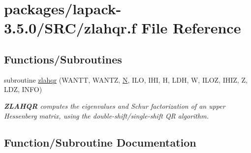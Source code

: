 \hypertarget{lapack-3_85_80_2SRC_2zlahqr_8f}{}\section{packages/lapack-\/3.5.0/\+S\+R\+C/zlahqr.f File Reference}
\label{lapack-3_85_80_2SRC_2zlahqr_8f}
\subsection*{Functions/\+Subroutines}
\begin{DoxyCompactItemize}
\item 
subroutine \hyperlink{lapack-3_85_80_2SRC_2zlahqr_8f_a32a8dc4443c2f0f528363b99d7a7b7e6}{zlahqr} (W\+A\+N\+T\+T, W\+A\+N\+T\+Z, \hyperlink{polmisc_8c_a0240ac851181b84ac374872dc5434ee4}{N}, I\+L\+O, I\+H\+I, H, L\+D\+H, W, I\+L\+O\+Z, I\+H\+I\+Z, Z, L\+D\+Z, I\+N\+F\+O)
\begin{DoxyCompactList}\small\item\em {\bfseries Z\+L\+A\+H\+Q\+R} computes the eigenvalues and Schur factorization of an upper Hessenberg matrix, using the double-\/shift/single-\/shift Q\+R algorithm. \end{DoxyCompactList}\end{DoxyCompactItemize}


\subsection{Function/\+Subroutine Documentation}
\hypertarget{lapack-3_85_80_2SRC_2zlahqr_8f_a32a8dc4443c2f0f528363b99d7a7b7e6}{}
